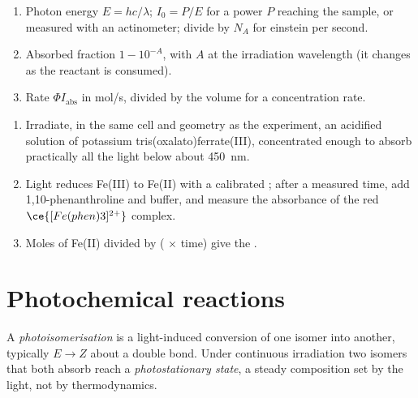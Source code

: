 \begin{method}\label{met:b3:photochemistry:photochemical-rate}
\begin{enumerate}
  \item Photon energy $E = hc/\lambda$;  $I_0 = P/E$ for a power $P$ reaching the
        sample, or measured with an actinometer; divide by $N_A$ for einstein per
        second.
  \item Absorbed fraction $1 - 10^{-A}$, with $A$ at the irradiation wavelength (it
        changes as the reactant is consumed).
  \item Rate $\Phi I_{\mathrm{abs}}$ in mol/s, divided by the volume for a concentration rate.
\end{enumerate}
\end{method}

\begin{method}\label{met:b3:photochemistry:actinometry}
\begin{enumerate}
  \item Irradiate, in the same cell and geometry as the experiment, an acidified
        solution of potassium tris(oxalato)ferrate(III), concentrated enough to
        absorb practically all the light below about \qty{450}{nm}.
  \item Light reduces Fe(III) to Fe(II) with a calibrated ; after a
        measured time, add 1,10-phenanthroline and buffer, and measure the
        absorbance of the red $\ce{[Fe(phen)3]^{2+}}$ complex.
  \item Moles of Fe(II) divided by ( $\times$ time) give the .
\end{enumerate}
\end{method}

\section{Photochemical reactions}

\begin{definition}\label{def:b3:photochemistry:photoisomerisation}
A \emph{photoisomerisation} is a light-induced
conversion of one isomer into another, typically $E \to Z$ about a double bond. Under
continuous irradiation two isomers that both absorb reach a
\emph{photostationary state}, a steady composition
set by the light, not by thermodynamics.
\end{definition}

